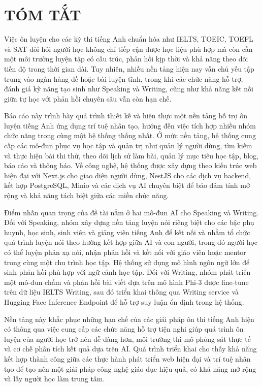\chapter*{TÓM TẮT}
Việc ôn luyện cho các kỳ thi tiếng Anh chuẩn hóa như IELTS, TOEIC, TOEFL và SAT đòi hỏi người học không chỉ tiếp cận được học liệu phù hợp mà còn cần một môi trường luyện tập có cấu trúc, phản hồi kịp thời và khả năng theo dõi tiến độ trong thời gian dài. Tuy nhiên, nhiều nền tảng hiện nay vẫn chủ yếu tập trung vào ngân hàng đề hoặc bài luyện tĩnh, trong khi các chức năng hỗ trợ, đánh giá kỹ năng tạo sinh như Speaking và Writing, cũng như khả năng kết nối giữa tự học với phản hồi chuyên sâu vẫn còn hạn chế.

Báo cáo này trình bày quá trình thiết kế và hiện thực một nền tảng hỗ trợ ôn luyện tiếng Anh ứng dụng trí tuệ nhân tạo, hướng đến việc tích hợp nhiều nhóm chức năng trong cùng một hệ thống thống nhất. Ở mức nền tảng, hệ thống cung cấp các mô-đun phục vụ học tập và quản trị như quản lý người dùng, tìm kiếm và thực hiện bài thi thử, theo dõi lịch sử làm bài, quản lý mục tiêu học tập, blog, báo cáo và thông báo. Về công nghệ, hệ thống được xây dựng theo kiến trúc web hiện đại với Next.js cho giao diện người dùng, NestJS cho các dịch vụ backend, kết hợp PostgreSQL, Minio và các dịch vụ AI chuyên biệt để bảo đảm tính mở rộng và khả năng tách biệt giữa các miền chức năng.

Điểm nhấn quan trọng của đề tài nằm ở hai mô-đun AI cho Speaking và Writing. Đối với Speaking, nhóm xây dựng nền tảng luyện nói riêng biệt cho các bậc phụ huynh, học sinh, sinh viên và giảng viên tiếng Anh để kết nối và nhằm tổ chức quá trình luyện nói theo hướng kết hợp giữa AI và con người, trong đó người học có thể luyện phản xạ nói, nhận phản hồi và kết nối với giáo viên hoặc mentor trong cùng một chu trình học tập. Hệ thống sử dụng mô hình ngôn ngữ lớn để sinh phản hồi phù hợp với ngữ cảnh học tập. Đối với Writing, nhóm phát triển một mô-đun chấm và phản hồi bài viết dựa trên mô hình Phi-3 được fine-tune trên dữ liệu IELTS Writing, sau đó triển khai thông qua Writing service và Hugging Face Inference Endpoint để hỗ trợ suy luận ổn định trong hệ thống.

Nền tảng này khắc phục những hạn chế của các giải pháp ôn thi tiếng Anh hiện có thông qua việc cung cấp các chức năng hỗ trợ tiện nghi giúp quá trình ôn luyện của người học trở nên dễ dàng hơn, môi trường thi mô phỏng sát thực tế và cơ chế phân tích kết quả dựa trên AI. Quá trình triển khai cho thấy khả năng kết hợp thành công giữa các thực hành phát triển web hiện đại và trí tuệ nhân tạo để tạo nên một giải pháp công nghệ giáo dục hiệu quả, có khả năng mở rộng và lấy người học làm trung tâm.